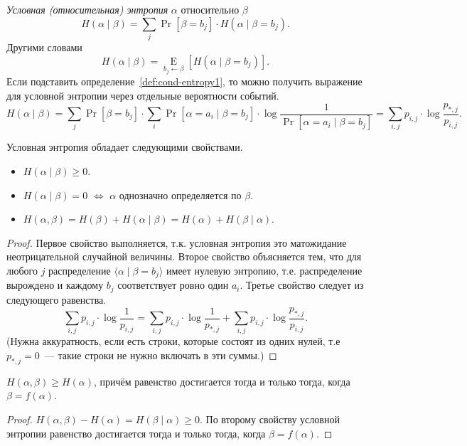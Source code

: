 \documentclass[12pt]{article}
\begin{document}
\begin{definition}\label{def:cond-entropy2}
\emph{Условная (относительная) энтропия} \(\alpha\) относительно \(\beta\)
\[H(\alpha\mid\beta) = \sum_j \Pr[\beta = b_j] \cdot H(\alpha\mid \beta = b_j). \]
Другими словами
\[H(\alpha\mid\beta) = \mathop{\mathrm{E}}\limits_{b_j\gets\beta}[H(\alpha\mid \beta = b_j)]. \]
Если подставить определение~\ref{def:cond-entropy1}, то можно получить выражение для условной энтропии через отдельные вероятности событий.
\[H(\alpha\mid\beta) = 
\sum_j \Pr[\beta = b_j]\cdot 
\sum_i \Pr[\alpha = a_i\mid \beta = b_j]\cdot 
\log\frac{1}{\Pr[\alpha = a_i\mid \beta = b_j]}  = 
\sum_{i,j} p_{i,j}\cdot\log\frac{p_{*,j}}{p_{i,j}} . \]
\end{definition}
\begin{lemma}
Условная энтропия обладает следующими свойствами.
\begin{itemize}
    \item \(H(\alpha\mid\beta)\ge 0\).
    \item \(H(\alpha\mid\beta) = 0\) \(\iff\) \(\alpha\) однозначно определяется по \(\beta\). 
    \item \(H(\alpha,\beta) = H(\beta)  + H(\alpha\mid\beta) 
                            = H(\alpha) + H(\beta\mid\alpha)\).
\end{itemize}
\end{lemma}
\begin{proof}
Первое свойство выполняется, т.к. условная энтропия это матожидание неотрицательной случайной величины. Второе свойство объясняется тем, что для любого \(j\) распределение \(\langle\alpha\mid\beta=b_j\rangle\) имеет нулевую энтропию, т.е. распределение вырождено и каждому \(b_j\) соответствует ровно один \(a_i\). Третье свойство следует из следующего равенства.
\[
\sum_{i,j} p_{i,j} \cdot \log\frac{1}{p_{i,j}} =
\sum_{i,j} p_{i,j} \cdot \log\frac{1}{p_{*,j}} +
\sum_{i,j} p_{i,j} \cdot \log\frac{p_{*,j}}{p_{i,j}}.
\]
(Нужна аккуратность, если есть строки, которые состоят из одних нулей, т.е \(p_{*,j} = 0\)~--- такие строки не нужно включать в эти суммы.)
\end{proof}
\begin{corollary} \(H(\alpha,\beta) \ge H(\alpha)\), причём равенство достигается тогда и только тогда, когда \(\beta = f(\alpha) \).
\end{corollary}
\begin{proof}
\(H(\alpha,\beta) - H(\alpha) = H(\beta\mid\alpha) \ge 0\). По второму свойству условной энтропии равенство достигается тогда и только тогда, когда \(\beta = f(\alpha)\).
\end{proof}
\end{document}
